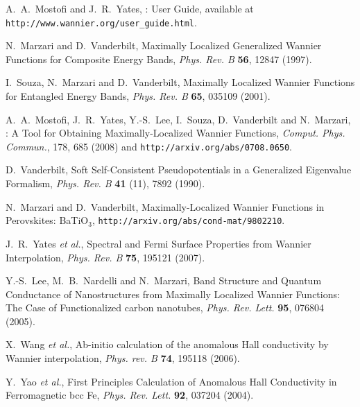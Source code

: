 \documentclass[a4paper,11pt,twoside]{article}
\begin{document}
\begin{thebibliography}{99}

 A.~A.~Mostofi and J.~R.~Yates, \wannier: User
  Guide, available at {\tt http://www.wannier.org/user\_guide.html}.

 N.~Marzari and D.~Vanderbilt, 
  Maximally Localized Generalized Wannier Functions for Composite
  Energy Bands, {\it Phys. Rev. B} {\bf 56}, 12847 (1997).  

 I.~Souza, N.~Marzari and D.~Vanderbilt, Maximally
     Localized Wannier Functions for Entangled Energy Bands, {\it
     Phys. Rev. B} {\bf 65}, 035109 (2001).

 A.~A.~Mostofi, J.~R.~Yates, Y.-S.~Lee, I.~Souza,
   D.~Vanderbilt and N.~Marzari, \wannier: A Tool for Obtaining
   Maximally-Localized Wannier Functions, {\it Comput. Phys. Commun.},
   178, 685 (2008) and {\tt http://arxiv.org/abs/0708.0650}.

 D.~Vanderbilt, Soft Self-Consistent Pseudopotentials in
  a Generalized Eigenvalue Formalism, {\it Phys. Rev. B} {\bf 41}
  (11), 7892 (1990).

 N.~Marzari and D.~Vanderbilt, Maximally-Localized
  Wannier Functions in Perovskites: BaTiO$_3$,
  {\tt http://arxiv.org/abs/cond-mat/9802210}.

 J.~R.~Yates {\it et al.}, Spectral and Fermi
  Surface Properties from Wannier Interpolation, {\it Phys. Rev. B}
  {\bf 75}, 195121 (2007). 

 Y.-S.~Lee, M.~B.~Nardelli and N.~Marzari, Band
  Structure and Quantum Conductance of Nanostructures from Maximally
  Localized Wannier Functions: The Case of Functionalized carbon
  nanotubes, {\it Phys. Rev. Lett.} {\bf 95}, 076804 (2005).

 X.~Wang {\it et al.}, Ab-initio calculation of
  the anomalous Hall conductivity by Wannier interpolation,
{\it Phys. rev. B} {\bf 74}, 195118 (2006).

 Y.~Yao {\it et al.}, First Principles Calculation
  of Anomalous Hall Conductivity in Ferromagnetic bcc Fe,
{\it Phys. Rev. Lett.} {\bf 92}, 037204 (2004).

\end{thebibliography}
\end{document}
